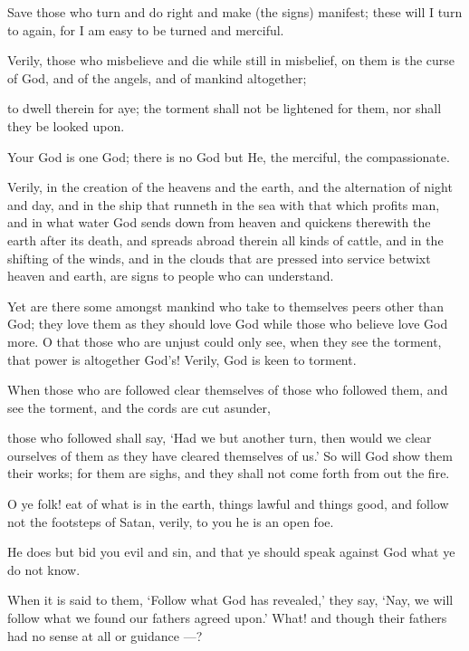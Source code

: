 \documentclass[fontsize=14pt, letterpaper, notitlepage, openany, DIV=12]{scrbook} %
\begin{document}
\noindent[2:160]
Save those who turn and do right and make (the signs) manifest; these will I turn to again,
for I am easy to be turned and merciful.

\noindent[2:161]
Verily, those who misbelieve and die while still in misbelief, on them is the curse of God,
and of the angels, and of mankind altogether;

\noindent[2:162]
to dwell therein for aye; the torment shall not be lightened for them, nor shall they be
looked upon.

\noindent[2:163]
Your God is one God; there is no God but He, the merciful, the compassionate.

\noindent[2:164]
Verily, in the creation of the heavens and the earth, and the alternation of night and day,
and in the ship that runneth in the sea with that which profits man, and in what water God sends
down from heaven and quickens therewith the earth after its death, and spreads abroad therein all
kinds of cattle, and in the shifting of the winds, and in the clouds that are pressed into service
betwixt heaven and earth, are signs to people who can understand.

\noindent[2:165]
Yet are there some amongst mankind who take to themselves peers other than God; they
love them as they should love God while those who believe love God more. O that those who are
unjust could only see, when they see the torment, that power is altogether God's! Verily, God is
keen to torment.

\noindent[2:166]
When those who are followed clear themselves of those who followed them, and see the
torment, and the cords are cut asunder,

\noindent[2:167]
those who followed shall say, `Had we but another turn, then would we clear ourselves of
them as they have cleared themselves of us.' So will God show them their works; for them are
sighs, and they shall not come forth from out the fire.

\noindent[2:168]
O ye folk! eat of what is in the earth, things lawful and things good, and follow not the
footsteps of Satan, verily, to you he is an open foe.

\noindent[2:169]
He does but bid you evil and sin, and that ye should speak against God what ye do not
know.

\noindent[2:170]
When it is said to them, `Follow what God has revealed,' they say, `Nay, we will follow
what we found our fathers agreed upon.' What! and though their fathers had no sense at all or
guidance ---?
\end{document}

